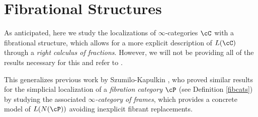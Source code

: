 





\section{Fibrational Structures}

As anticipated, here we study the localizations of $\infty$-categories $\cC$
with a fibrational structure, which allows for a more explicit
description of $L(\cC)$ through a \emph{right calculus of fractions}. However,
we will not be providing all of the results necessary
for this and refer to \cite[Ch.\ 7.2-7.4]{Cis19}.

\noindent
This generalizes
previous work by Szumilo-Kapulkin \cite{Szu14,KS15}, who proved
similar results for the simplicial localization of a \emph{fibration category}
$\cP$ (see Definition \ref{fibcats})
by studying the associated \emph{$\infty$-category of frames}, which provides
a concrete model of $L(N(\cP))$ avoiding inexplicit fibrant replacements.

